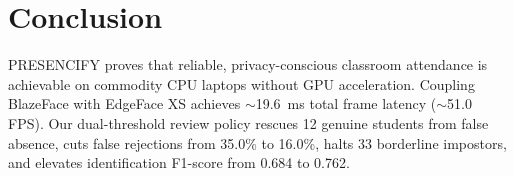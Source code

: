 \documentclass[conference]{IEEEtran}
\begin{document}
\section{Conclusion}
PRESENCIFY proves that reliable, privacy-conscious classroom attendance is achievable on commodity CPU laptops without GPU acceleration. Coupling BlazeFace with EdgeFace XS achieves $\sim$19.6~ms total frame latency ($\sim$51.0 FPS). Our dual-threshold review policy rescues 12 genuine students from false absence, cuts false rejections from 35.0\% to 16.0\%, halts 33 borderline impostors, and elevates identification F1-score from 0.684 to 0.762.



\end{document}

